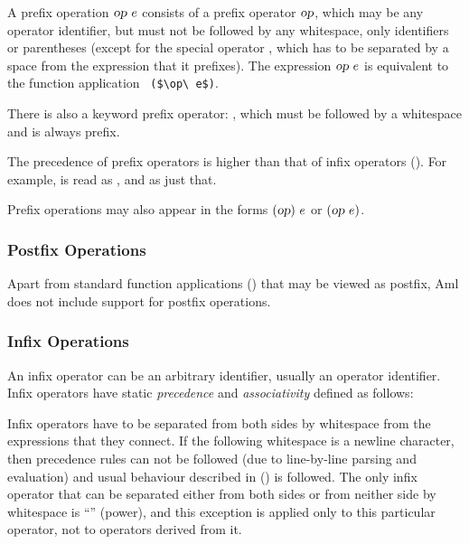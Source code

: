 A prefix operation $\mbox{\sl op}\ e$ consists of a prefix operator $\mbox{\sl op}$, which may be any operator identifier, but must not be followed by any whitespace, only identifiers or parentheses (except for the special operator , which has to be separated by a space from the expression that it prefixes). The expression $\mbox{\sl op}\ e$ is equivalent to the function application ~\lstinline!($\op\ e$)!.

There is also a keyword prefix operator: , which must be followed by a whitespace and is always prefix.

The precedence of prefix operators is higher than that of infix operators (). For example,  is read as , and  as just that. 

Prefix operations may also appear in the forms $(\mbox{\sl op})\ e$ or $(\mbox{\sl op}\ e)$. 





\subsubsection{Postfix Operations}

Apart from standard function applications () that may be viewed as postfix, Aml does not include support for postfix operations. 





\subsubsection{Infix Operations}
\label{sec:infix-operations}

An infix operator can be an arbitrary identifier, usually an operator identifier. Infix operators have static {\em precedence} and {\em associativity} defined as follows:

Infix operators have to be separated from both sides by whitespace from the expressions that they connect. If the following whitespace is a newline character, then precedence rules can not be followed (due to line-by-line parsing and evaluation) and usual behaviour described in () is followed. The only infix operator that can be separated either from both sides or from neither side by whitespace is ``\code{^}'' (power), and this exception is applied only to this particular operator, not to operators derived from it. 

